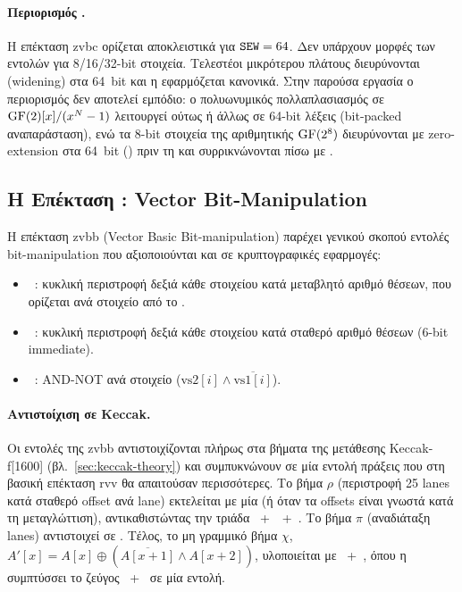 \paragraph{Περιορισμός \SEW.}
Η επέκταση \gls{zvbc} ορίζεται αποκλειστικά για $\texttt{SEW} = 64$. Δεν υπάρχουν
μορφές των εντολών για 8/16/32-bit στοιχεία. Τελεστέοι μικρότερου πλάτους
διευρύνονται (widening) στα 64~bit και η \vclmul εφαρμόζεται κανονικά. Στην
παρούσα εργασία ο περιορισμός δεν αποτελεί εμπόδιο: ο πολυωνυμικός
πολλαπλασιασμός σε $\mathrm{GF}(2)[x]/(x^N - 1)$ λειτουργεί ούτως ή άλλως σε 64-bit
λέξεις (bit-packed αναπαράσταση), ενώ τα 8-bit στοιχεία της αριθμητικής
$\mathrm{GF}(2^8)$ διευρύνονται με zero-extension στα 64~bit () πριν τη
\vclmul και συρρικνώνονται πίσω με .

\subsection{Η Επέκταση \Zvbb: Vector Bit-Manipulation}
\label{ssec:zvbb-extension}

Η επέκταση \gls{zvbb} (Vector Basic Bit-manipulation) παρέχει γενικού σκοπού 
εντολές bit-manipulation που αξιοποιούνται και σε κρυπτογραφικές εφαρμογές:

\begin{itemize}
  \item {}~: κυκλική περιστροφή
    δεξιά κάθε στοιχείου κατά μεταβλητό αριθμό θέσεων, που ορίζεται ανά
    στοιχείο από το .
  \item {}~: κυκλική περιστροφή
    δεξιά κάθε στοιχείου κατά σταθερό αριθμό θέσεων (6-bit immediate).
  \item {}~: AND-NOT ανά στοιχείο
    ($\text{vs2}[i] \wedge \overline{\text{vs1}[i]}$).
\end{itemize}

\paragraph{Αντιστοίχιση σε Keccak.}
Οι εντολές της \gls{zvbb} αντιστοιχίζονται πλήρως στα βήματα της μετάθεσης
Keccak-f[1600] (βλ.~\cref{sec:keccak-theory}) και συμπυκνώνουν σε μία εντολή
πράξεις που στη βασική επέκταση \gls{rvv} θα απαιτούσαν περισσότερες. Το βήμα $\rho$
(περιστροφή \num{25} lanes κατά σταθερό offset ανά lane) εκτελείται με μία
 (ή  όταν τα offsets είναι γνωστά κατά τη
μεταγλώττιση), αντικαθιστώντας την τριάδα
~+~~+~. Το βήμα $\pi$ (αναδιάταξη lanes)
αντιστοιχεί σε . Τέλος, το μη γραμμικό βήμα $\chi$,
$A'[x] = A[x] \oplus (\overline{A[x+1]} \wedge A[x+2])$, υλοποιείται με
~+~, όπου η  συμπτύσσει το ζεύγος
~+~ σε μία εντολή.

